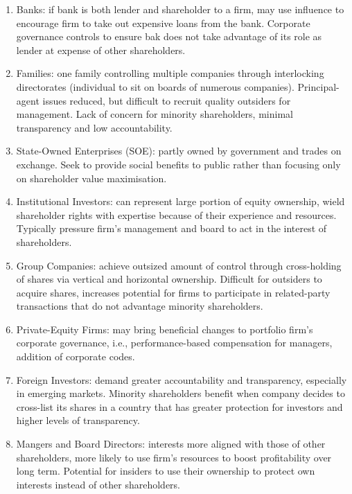\begin{remark} 
\begin{enumerate}[label=\roman*.]
\setlength{\itemsep}{0pt}
\item Banks: if bank is both lender and shareholder to a firm, may use influence to encourage firm to take out expensive loans from the bank. Corporate governance controls to ensure bak does not take advantage of its role as lender at expense of other shareholders.
\item Families: one family controlling multiple companies through interlocking directorates (individual to sit on boards of numerous companies). Principal-agent issues reduced, but difficult to recruit quality outsiders for management. Lack of concern for minority shareholders, minimal transparency and low accountability.
\item State-Owned Enterprises (SOE): partly owned by government and trades on exchange. Seek to provide social benefits to public rather than focusing only on shareholder value maximisation.
\item Institutional Investors: can represent large portion of equity ownership, wield shareholder rights with expertise because of their experience and resources. Typically pressure firm's management and board to act in the interest of shareholders.
\item Group Companies: achieve outsized amount of control through cross-holding of shares via vertical and horizontal ownership. Difficult for outsiders to acquire shares, increases potential for firms to participate in related-party transactions that do not advantage minority shareholders.
\item Private-Equity Firms: may bring beneficial changes to portfolio firm's corporate governance, i.e., performance-based compensation for managers, addition of corporate codes.
\item Foreign Investors: demand greater accountability and transparency, especially in emerging markets. Minority shareholders benefit when company decides to cross-list its shares in a country that has greater protection for investors and higher levels of transparency.
\item Mangers and Board Directors: interests more aligned with those of other shareholders, more likely to use firm's resources to boost profitability over long term. Potential for insiders to use their ownership to protect own interests instead of other shareholders.
\end{enumerate}
\end{remark}

